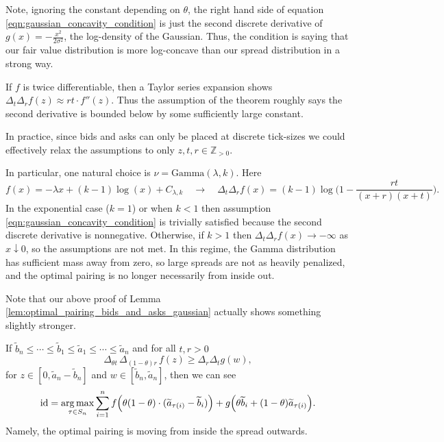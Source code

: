 \noindent Note, ignoring the constant depending on $\theta$, the right hand side of equation \eqref{eqn:gaussian_concavity_condition} is just the second
discrete derivative of $g(x) = -\frac{x^2}{2\sigma^2}$, the log-density of the Gaussian. Thus, the
condition is saying that our fair value distribution is more log-concave than our spread distribution in a strong way.

\begin{remark}
    If $f$ is twice differentiable, then a Taylor series expansion shows
     $\Delta_t \Delta_r f(z) \approx rt \cdot f''(z)$. Thus the
     assumption of the theorem roughly says the second derivative is bounded
     below by some sufficiently large constant.
\end{remark}

\begin{remark}
    In practice, since bids and asks can only be placed at discrete tick-sizes
    we could effectively relax the assumptions to only $z,t,r \in \mathbb{Z}_{> 0}$.
\end{remark}

\begin{example}
    In particular, one natural choice is $\nu = \mathrm{Gamma}(\lambda, k)$. Here
    \[f(x) = -\lambda x + (k-1) \log(x) + C_{\lambda, k} \quad \to \quad \Delta_t\Delta_r f(x) = (k-1) \log\bigg(1 - \frac{rt}{(x+r)(x+t)}\bigg). \]
    \noindent In the exponential case ($k=1$) or when $k < 1$ then assumption
     \eqref{eqn:gaussian_concavity_condition} is trivially satisfied because
     the second discrete derivative is nonnegative. Otherwise, if $k > 1$ then $\Delta_t \Delta_r f(x) \to - \infty$ as $x \downarrow 0$,
     so the assumptions are not met. In this regime, the Gamma distribution has sufficient mass away from zero, so
     large spreads are not as heavily penalized, and the optimal pairing is no longer necessarily from inside out.
\end{example}

\noindent Note that our above proof of Lemma \ref{lem:optimal_pairing_bids_and_asks_gaussian} actually shows something slightly stronger.

\begin{corollary}
\label{cor:optimal_pairing_bids_and_asks_general}
    If $\widetilde b_n \leq \cdots \leq \widetilde b_1 \leq \widetilde a_1 \leq \cdots \leq \widetilde a_n$ and for all $t,r > 0$
    \[\Delta_{\theta t} \, \Delta_{(1-\theta) r} \, f(z) \geq \Delta_{r} \Delta_{t} g(w),\]
    \noindent for $z \in [0, \widetilde a_n-\widetilde b_n]$ and $w \in [\widetilde b_n,\widetilde a_n]$, then we can see
    \[\mathrm{id} = \operatorname*{arg\,max}_{\tau \in S_n} \sum_{i=1}^n f\Big(\theta(1-\theta) \cdot (\widetilde a_{\tau(i)} - \widetilde b_i) \Big ) + g\Big(\theta \widetilde b_i + (1-\theta) \widetilde a_{\tau(i)}\Big). \]
    \noindent Namely, the optimal pairing is moving from inside the spread outwards.
\end{corollary}


